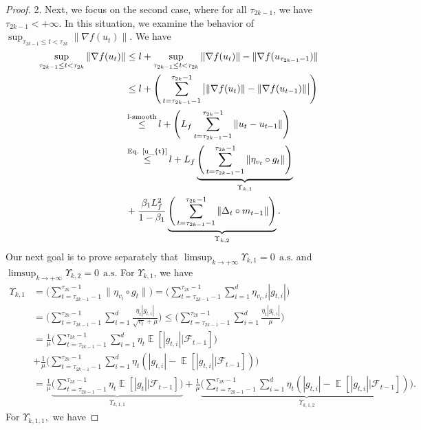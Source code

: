 \documentclass{article} %
\DeclareMathOperator{\Expect}{\mathbb{E}}
\begin{document}
\begin{proof}
2. Next, we focus on the second case, where for all $\tau_{2k-1}$, we have $\tau_{2k-1} < +\infty$. In this situation, we examine the behavior of $\sup_{\tau_{2k-1} \leq t < \tau_{2k}} \|\nabla f(u_{t})\|.$ We have
\begin{align*}
\sup_{\tau_{2k-1} \leq t < \tau_{2k}} \|\nabla f(u_{t})\|&\le l+\sup_{\tau_{2k-1} \leq t < \tau_{2k}} \|\nabla f(u_{t})\|-\|\nabla f(u_{\tau_{2k-1}-1})\|\\&\le l+\Bigg(
\sum_{t=\tau_{2k-1}-1}^{\tau_{2k}-1}\big|\|\nabla f(u_{t})\|-\|\nabla f(u_{t-1})\|\big|\Bigg) \\&\mathop{\le}^{\text{l-smooth}}l+\Bigg(
L_{f}\sum_{t=\tau_{2k-1}-1}^{\tau_{2k}-1}\|u_{t}-u_{t-1}\|\Bigg) \\&\mathop{\le}^{\text{Eq. \ref{u_{t}}}}l+L_{f}\underbrace{\Bigg(
\sum_{t=\tau_{2k-1}-1}^{\tau_{2k}-1}\|\eta_{v_{t}}\circ g_{t}\|\Bigg)}_{\Upsilon_{k,1}}\\&+ \frac{\beta_{1}L^{2}_{f}}{1-\beta_{1}}\underbrace{\Bigg(
\sum_{t=\tau_{2k-1}-1}^{\tau_{2k}-1}\|\Delta_{t}\circ m_{t-1}\|\Bigg)}_{\Upsilon_{k,2}}.
\end{align*}
Our next goal is to prove separately that $\limsup_{k \rightarrow +\infty} \Upsilon_{k,1} = 0 \ \ \text{a.s.}$ and $\limsup_{k \rightarrow +\infty} \Upsilon_{k,2} = 0 \ \ \text{a.s.}$ For $\Upsilon_{k,1}$, we have
\begin{align*}
\Upsilon_{k,1}&=\Bigg(
\sum_{t=\tau_{2k-1}-1}^{\tau_{2k}-1}\|\eta_{v_{t}}\circ g_{t}\|\Bigg)=\Bigg(
\sum_{t=\tau_{2k-1}-1}^{\tau_{2k}-1}\sum_{i=1}^{d}\eta_{v_{t},i}|g_{t,i}|\Bigg)\\&=\Bigg(
\sum_{t=\tau_{2k-1}-1}^{\tau_{2k}-1}\sum_{i=1}^{d}\frac{\eta_{t}|g_{t,i}|}{\sqrt{v_{t}}+\mu}\Bigg)\le \Bigg(
\sum_{t=\tau_{2k-1}-1}^{\tau_{2k}-1}\sum_{i=1}^{d}\frac{\eta_{t}|g_{t,i}|}{\mu}\Bigg)\\&=\frac{1}{\mu}\Bigg(
\sum_{t=\tau_{2k-1}-1}^{\tau_{2k}-1}\sum_{i=1}^{d}{\eta_{t}\Expect[|g_{t,i}||\mathscr{F}_{t-1}]}\Bigg)\\&+\frac{1}{\mu}\Bigg(
\sum_{t=\tau_{2k-1}-1}^{\tau_{2k}-1}\sum_{i=1}^{d}{\eta_{t}(|g_{t,i}|-\Expect[|g_{t,i}||\mathscr{F}_{t-1}])}\Bigg)\\&=\frac{1}{\mu}\underbrace{\Bigg(
\sum_{t=\tau_{2k-1}-1}^{\tau_{2k}-1}\eta_{t}{\Expect[|g_{t}||\mathscr{F}_{t-1}]}\Bigg)}_{\Upsilon_{k,1,1}}+\frac{1}{\mu}\underbrace{\Bigg(
\sum_{t=\tau_{2k-1}-1}^{\tau_{2k}-1}\sum_{i=1}^{d}{\eta_{t}(|g_{t,i}|-\Expect[|g_{t,i}||\mathscr{F}_{t-1}])}\Bigg)}_{\Upsilon_{k,1,2}}.
\end{align*}
For $\Upsilon_{k,1,1},$ we have

\end{proof}
\end{document}
